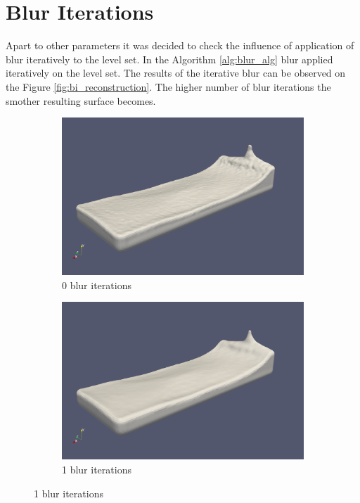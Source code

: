 \section{Blur Iterations}
Apart to other parameters it was decided to check the influence of application of blur iteratively to the level set. In the Algorithm \ref{alg:blur_alg} blur applied iteratively on the level set. The results of the iterative blur can be observed on the Figure \ref{fig:bi_reconstruction}. The higher number of blur iterations the smother resulting surface becomes. 
\begin{figure}[H]
        \begin{subfigure}[b]{0.5\textwidth}
               \includegraphics[width=\textwidth]{figures/ReconstructionIterations0.png}
				\caption{0 blur iterations}
               \label{fig:bi_original}
        \end{subfigure}
        \begin{subfigure}[b]{0.5\textwidth}
               \includegraphics[width=\textwidth]{figures/ReconstructionIterations1.png}
				\caption{1 blur iterations}


\end{subfigure}
\end{figure}
